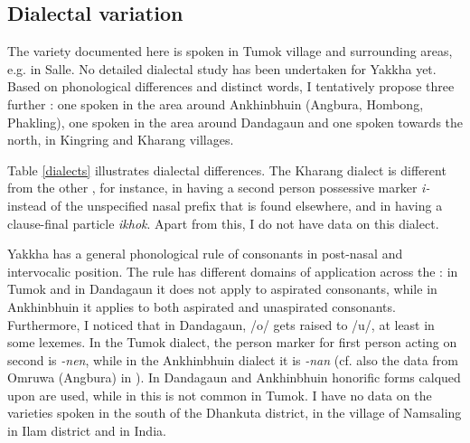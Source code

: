 \subsection{Dialectal variation}\label{sc-dialect}

The variety documented here is spoken in Tumok village and surrounding areas, e.g. in Salle. No detailed dialectal study has been undertaken for Yakkha yet. Based on phonological differences and distinct  words, I tentatively propose three further : one spoken in the area around Ankhinbhuin (Angbura, Hombong, Phakling), one spoken in the area around Dandagaun and one spoken towards the north, in Kingring and Kharang villages. 

Table \ref{dialects} illustrates dialectal differences. The Kharang dialect is different from the other , for instance, in having a second person possessive marker \emph{i-} instead of the unspecified nasal prefix that is found elsewhere,  and in having a clause-final  particle \emph{ikhok}. Apart from this, I do not have data on this dialect. 

Yakkha has a general phonological rule of  consonants in post-nasal and intervocalic position. The rule has different domains of application across the : in Tumok and in Dandagaun it does not apply to aspirated consonants, while in Ankhinbhuin it applies to both aspirated and unaspirated consonants. Furthermore, I noticed that in Dandagaun,  /o/ gets raised to /u/, at least in some lexemes. In the Tumok  dialect, the person marker for first person acting on second is \emph{-nen}, while in the Ankhinbhuin dialect it is \emph{-nan} (cf. also the data from Omruwa (Angbura) in \citet{Driem1994The-Yakkha}). In Dandagaun and Ankhinbhuin honorific  forms calqued upon  are used, while in  this is not common in Tumok. I have no data on the varieties spoken in the south of the Dhankuta district, in the village of Namsaling in Ilam district and in India.



